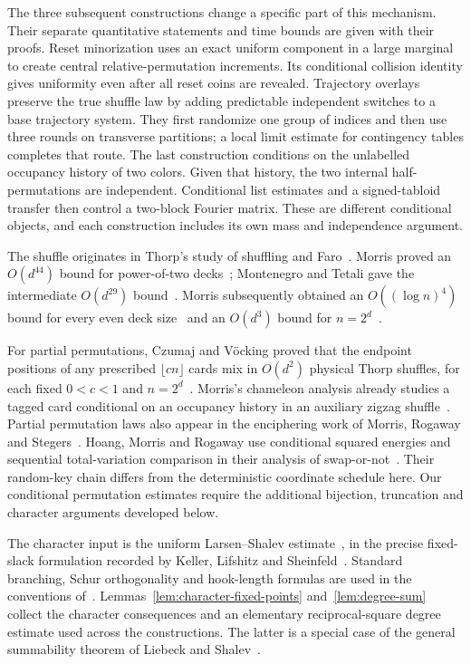 The three subsequent constructions change a specific part of this mechanism. Their separate quantitative statements and time bounds are given with their proofs. Reset minorization uses an exact uniform component in a large marginal to create central relative-permutation increments. Its conditional collision identity gives uniformity even after all reset coins are revealed. Trajectory overlays preserve the true shuffle law by adding predictable independent switches to a base trajectory system. They first randomize one group of indices and then use three rounds on transverse partitions; a local limit estimate for contingency tables completes that route. The last construction conditions on the unlabelled occupancy history of two colors. Given that history, the two internal half-permutations are independent. Conditional list estimates and a signed-tabloid transfer then control a two-block Fourier matrix. These are different conditional objects, and each construction includes its own mass and independence argument.

The shuffle originates in Thorp's study of shuffling and Faro~\cite{thorp}. Morris proved an $O(d^{44})$ bound for power-of-two decks~\cite{morris44}; Montenegro and Tetali gave the intermediate $O(d^{29})$ bound~\cite[Theorems~6.14--6.15]{montenegro-tetali2006}. Morris subsequently obtained an $O((\log n)^4)$ bound for every even deck size~\cite{morris4} and an $O(d^3)$ bound for $n=2^d$~\cite{morris3}.

For partial permutations, Czumaj and V\"ocking proved that the endpoint positions of any prescribed $\lfloor cn\rfloor$ cards mix in $O(d^2)$ physical Thorp shuffles, for each fixed $0<c<1$ and $n=2^d$~\cite{czumaj-vocking2014}. Morris's chameleon analysis already studies a tagged card conditional on an occupancy history in an auxiliary zigzag shuffle~\cite[preprint, Section~4, Lemma~3]{morris44}. Partial permutation laws also appear in the enciphering work of Morris, Rogaway and Stegers~\cite[Theorem~1 and Lemma~2, proved in Appendix~A]{mrs}. Hoang, Morris and Rogaway use conditional squared energies and sequential total-variation comparison in their analysis of swap-or-not~\cite[Section~3]{hmr2014}. Their random-key chain differs from the deterministic coordinate schedule here. Our conditional permutation estimates require the additional bijection, truncation and character arguments developed below.

The character input is the uniform Larsen--Shalev estimate~\cite[Theorem~1.1]{larsen-shalev2008}, in the precise fixed-slack formulation recorded by Keller, Lifshitz and Sheinfeld~\cite[Definition~2.1 and Theorem~2.2]{keller-lifshitz-sheinfeld2024}. Standard branching, Schur orthogonality and hook-length formulas are used in the conventions of~\cite{sagan,etingof}. Lemmas~\ref{lem:character-fixed-points} and~\ref{lem:degree-sum} collect the character consequences and an elementary reciprocal-square degree estimate used across the constructions. The latter is a special case of the general summability theorem of Liebeck and Shalev~\cite[Theorem~2.6]{liebeck-shalev2004}.


